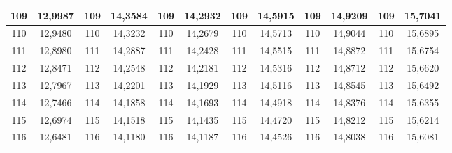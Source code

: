 \documentclass[a4paper,12pt]{article} %
\begin{document}
\begin{longtable}[c]{cccccccccc|c|c|}
	\multicolumn{1}{|c|}{109} & \multicolumn{1}{c|}{12,9987} & \multicolumn{1}{c|}{109} & \multicolumn{1}{c|}{14,3584} & \multicolumn{1}{c|}{109} & \multicolumn{1}{c|}{14,2932} & \multicolumn{1}{c|}{109} & \multicolumn{1}{c|}{14,5915} & \multicolumn{1}{c|}{109} & 14,9209 & 109 & 15,7041 \\ \hline
	\multicolumn{1}{|c|}{110} & \multicolumn{1}{c|}{12,9480} & \multicolumn{1}{c|}{110} & \multicolumn{1}{c|}{14,3232} & \multicolumn{1}{c|}{110} & \multicolumn{1}{c|}{14,2679} & \multicolumn{1}{c|}{110} & \multicolumn{1}{c|}{14,5713} & \multicolumn{1}{c|}{110} & 14,9044 & 110 & 15,6895 \\ \hline
	\multicolumn{1}{|c|}{111} & \multicolumn{1}{c|}{12,8980} & \multicolumn{1}{c|}{111} & \multicolumn{1}{c|}{14,2887} & \multicolumn{1}{c|}{111} & \multicolumn{1}{c|}{14,2428} & \multicolumn{1}{c|}{111} & \multicolumn{1}{c|}{14,5515} & \multicolumn{1}{c|}{111} & 14,8872 & 111 & 15,6754 \\ \hline
	\multicolumn{1}{|c|}{112} & \multicolumn{1}{c|}{12,8471} & \multicolumn{1}{c|}{112} & \multicolumn{1}{c|}{14,2548} & \multicolumn{1}{c|}{112} & \multicolumn{1}{c|}{14,2181} & \multicolumn{1}{c|}{112} & \multicolumn{1}{c|}{14,5316} & \multicolumn{1}{c|}{112} & 14,8712 & 112 & 15,6620 \\ \hline
	\multicolumn{1}{|c|}{113} & \multicolumn{1}{c|}{12,7967} & \multicolumn{1}{c|}{113} & \multicolumn{1}{c|}{14,2201} & \multicolumn{1}{c|}{113} & \multicolumn{1}{c|}{14,1929} & \multicolumn{1}{c|}{113} & \multicolumn{1}{c|}{14,5116} & \multicolumn{1}{c|}{113} & 14,8545 & 113 & 15,6492 \\ \hline
	\multicolumn{1}{|c|}{114} & \multicolumn{1}{c|}{12,7466} & \multicolumn{1}{c|}{114} & \multicolumn{1}{c|}{14,1858} & \multicolumn{1}{c|}{114} & \multicolumn{1}{c|}{14,1693} & \multicolumn{1}{c|}{114} & \multicolumn{1}{c|}{14,4918} & \multicolumn{1}{c|}{114} & 14,8376 & 114 & 15,6355 \\ \hline
	\multicolumn{1}{|c|}{115} & \multicolumn{1}{c|}{12,6974} & \multicolumn{1}{c|}{115} & \multicolumn{1}{c|}{14,1518} & \multicolumn{1}{c|}{115} & \multicolumn{1}{c|}{14,1435} & \multicolumn{1}{c|}{115} & \multicolumn{1}{c|}{14,4720} & \multicolumn{1}{c|}{115} & 14,8212 & 115 & 15,6214 \\ \hline
	\multicolumn{1}{|c|}{116} & \multicolumn{1}{c|}{12,6481} & \multicolumn{1}{c|}{116} & \multicolumn{1}{c|}{14,1180} & \multicolumn{1}{c|}{116} & \multicolumn{1}{c|}{14,1187} & \multicolumn{1}{c|}{116} & \multicolumn{1}{c|}{14,4526} & \multicolumn{1}{c|}{116} & 14,8038 & 116 & 15,6081 \\ \hline

\end{longtable}
\end{document}
